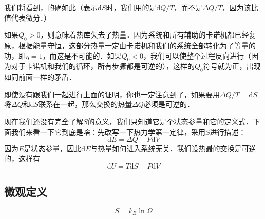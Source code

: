 我们将看到，的确如此（表示$\mathrm dS $时，我们用的是$\mathrm dQ/T$，而不是$\Delta Q/T$，因为该比值代表微分．）

如果$Q_0>0$，则意味着热库失去了热量．因为系统和所有辅助的卡诺机都已经复原，根据能量守恒，这部分热量一定由卡诺机和我们的系统全部转化为了等量的功，即$\eta=1$，而这是不可能的．如果$Q_0<0$，我们可以使整个过程反向进行（因为对于卡诺机和我们的循环，所有步骤都是可逆的），这样的$Q_0$符号就为正，出现如同前面一样的矛盾．

即使没有跟我们一起进行上面的证明，你也一定注意到了，如果要用$\Delta Q/T=\mathrm d S$将$\Delta Q$和$\mathrm dS$联系在一起，那么交换的热量$\Delta Q$必须是可逆的．

现在我们还没有完全了解$S$的意义，我们只知道它是个状态参量和它的定义式．下面我们来看一下它到底是啥：先改写一下热力学第一定律，采用$S$进行描述：
\begin{equation}
\mathrm d E = \Delta Q - P\mathrm d V
\end{equation}
因为$E$是状态参量，因此$\mathrm d E$与热量如何进入系统无关．我们设热最的交换是可逆的，这样有
\begin{equation}
\mathrm d U =T\mathrm dS - P\mathrm d V
\end{equation}
\subsection{微观定义}
\begin{equation}
S = k_B \ln \Omega
\end{equation}

 
